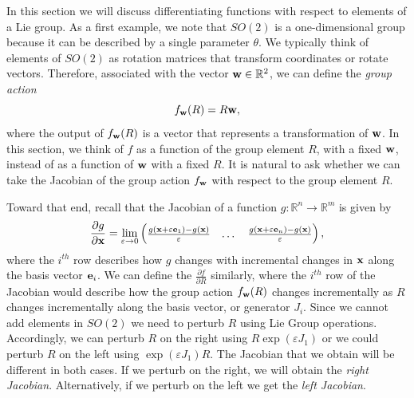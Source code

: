 In this section we will discuss differentiating functions with respect to elements of a Lie group.  As a first example, we note that $SO(2)$ is a one-dimensional group because it can be described by a single parameter $\theta$.  We typically think of elements of $SO(2)$ as rotation matrices that transform coordinates or rotate vectors.  Therefore, associated with the vector $\mathbf{w}\in\mathbb{R}^2$, we can define the {\em group action}
\[
	f_{\mathbf{w}}(R) = R\mathbf{w},
\]
where the output of $f_{\mathbf{w}}(R)$ is a vector that represents a transformation of $\mathbf{w}$. In this section, we think of $f$ as a function of the group element $R$, with a fixed $\mathbf{w}$, instead of as a function of $\mathbf{w}$ with a fixed $R$.  It is natural to ask whether we can take the Jacobian of the group action $f_{\mathbf{w}}$ with respect to the group element $R$.  


Toward that end, recall that the Jacobian of a function $g: \mathbb{R}^n\to\mathbb{R}^m$ is given by
\[
\frac{\partial g}{\partial \mathbf{x}} = \lim_{\varepsilon\to 0} \begin{pmatrix} \frac{g(\mathbf{x}+\varepsilon\mathbf{e}_1)-g(\mathbf{x})}{\varepsilon} & \dots & \frac{g(\mathbf{x}+\varepsilon\mathbf{e}_n)-g(\mathbf{x})}{\varepsilon}\end{pmatrix},
\]
where the $i^{th}$ row describes how  $g$ changes with incremental changes in $\mathbf{x}$ along the basis vector $\mathbf{e}_i$.  
We can define the $\frac{\partial f}{\partial R}$ similarly, where the $i^{th}$ row of the Jacobian would describe how the group action $f_{\mathbf{w}}(R)$ changes incrementally as $R$ changes incrementally along the basis vector, or generator $J_i$.
Since we cannot add elements in $SO(2)$ we need to perturb $R$ using Lie Group operations.  Accordingly, we can perturb $R$ on the right using 
$R\exp(\varepsilon J_1)$ or we could perturb $R$ on the left using $\exp(\varepsilon J_1)R$.  The Jacobian that we obtain will be different in both cases.  If we perturb on the right, we will obtain the {\em right Jacobian}.  Alternatively, if we perturb on the left we get the {\em left Jacobian}.  

